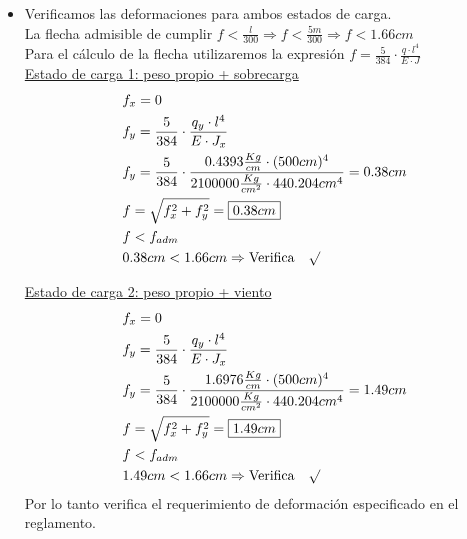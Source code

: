\begin{itemize}
\item Verificamos las deformaciones para ambos estados de carga.\\
La flecha admisible de cumplir $f < \frac{l}{300} \Rightarrow f < \frac{5m}{300} \Rightarrow f < 1.66cm$\\
Para el cálculo de la flecha utilizaremos la expresión $f= \frac{5}{384} \cdot \frac{q \cdot l^4}{E \cdot J}$\\

\underline{Estado de carga 1: peso propio + sobrecarga}
\begin{align*}
& f_x=0 \\
& f_y=\frac{5}{384} \cdot \frac{q_y \cdot l^4}{E \cdot J_x}\\
& f_y=\frac{5}{384} \cdot \frac{0.4393 \frac{Kg}{cm} \cdot (500cm)^4}{2100000 \frac{Kg}{cm^2} \cdot 440.204 cm^4} = 0.38cm\\
& f = \sqrt{f_x^2+f_y^2} = \framebox{$0.38cm$}\\
& f < f_{adm}\\
& 0.38cm < 1.66cm \Rightarrow \text{Verifica} \quad \surd
\end{align*}

\underline{Estado de carga 2: peso propio + viento}
\begin{align*}
& f_x= 0 \\
& f_y=\frac{5}{384} \cdot \frac{q_y \cdot l^4}{E \cdot J_x}\\
& f_y=\frac{5}{384} \cdot \frac{1.6976 \frac{Kg}{cm} \cdot (500cm)^4}{2100000 \frac{Kg}{cm^2} \cdot 440.204 cm^4} = 1.49cm\\
& f = \sqrt{f_x^2+f_y^2} = \framebox{$1.49cm$}\\
& f < f_{adm}\\
& 1.49cm < 1.66cm \Rightarrow \text{Verifica} \quad \surd
\end{align*}
Por lo tanto verifica el requerimiento de deformación especificado en el reglamento.\\
\end{itemize}
